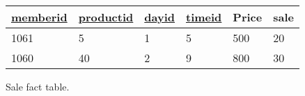 \begin{figure}[H]
    \begin{tabular}{|l|l|l|l|l|l|}
        \hline
        \underline{memberid}    & \underline{productid}     & \underline{dayid}     & \underline{timeid} & Price    & sale  \\ \hline
        1061                    & 5                         & 1                     & 5                  & 500      & 20    \\ \hline
        1060                    & 40                        & 2                     & 9                  & 800      & 30    \\ \hline
    \end{tabular}
    \caption{Sale fact table.}
    \label{fig:sale_scheme}
\end{figure}